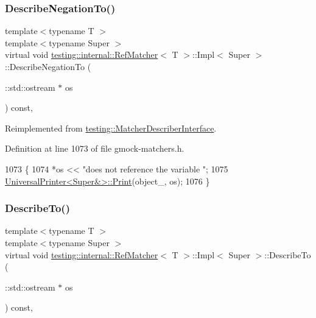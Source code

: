 \subsubsection{\texorpdfstring{Describe\+Negation\+To()}{DescribeNegationTo()}}
{\footnotesize\ttfamily template$<$typename T $>$ \\
template$<$typename Super $>$ \\
virtual void \hyperlink{classtesting_1_1internal_1_1RefMatcher}{testing\+::internal\+::\+Ref\+Matcher}$<$ T $>$\+::Impl$<$ Super $>$\+::Describe\+Negation\+To (\begin{DoxyParamCaption}\item[{\+::std\+::ostream $\ast$}]{os }\end{DoxyParamCaption}) const\hspace{0.3cm}{\ttfamily [inline]}, {\ttfamily [virtual]}}



Reimplemented from \hyperlink{classtesting_1_1MatcherDescriberInterface_a2071afbc47097c4d1c0064275af34db0}{testing\+::\+Matcher\+Describer\+Interface}.



Definition at line 1073 of file gmock-\/matchers.\+h.


\begin{DoxyCode}
1073                                                           \{
1074       *os << \textcolor{stringliteral}{"does not reference the variable "};
1075       \hyperlink{classtesting_1_1internal_1_1UniversalPrinter_aecec021e1abbaa260b701e24e3fe33eb}{UniversalPrinter<Super&>::Print}(object\_, os);
1076     \}
\end{DoxyCode}
\mbox{\label{classtesting_1_1internal_1_1RefMatcher_3_01T_01_6_01_4_1_1Impl_a3ddb19a24bfbb627a9c6194b665cbd19}} 
\subsubsection{\texorpdfstring{Describe\+To()}{DescribeTo()}}
{\footnotesize\ttfamily template$<$typename T $>$ \\
template$<$typename Super $>$ \\
virtual void \hyperlink{classtesting_1_1internal_1_1RefMatcher}{testing\+::internal\+::\+Ref\+Matcher}$<$ T $>$\+::Impl$<$ Super $>$\+::Describe\+To (\begin{DoxyParamCaption}\item[{\+::std\+::ostream $\ast$}]{os }\end{DoxyParamCaption}) const\hspace{0.3cm}{\ttfamily [inline]}, {\ttfamily [virtual]}}



